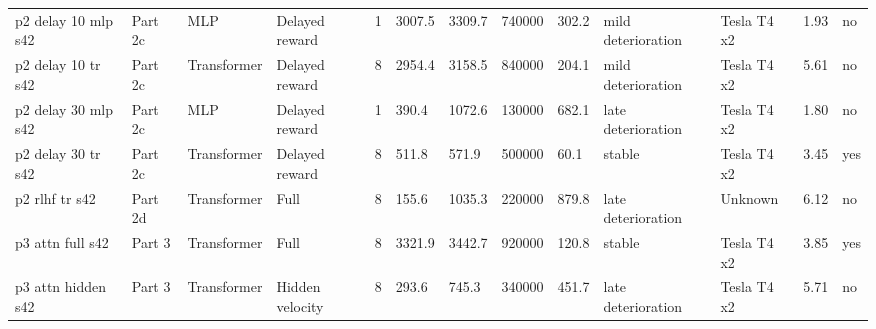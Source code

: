 \documentclass[11pt]{article}
\begin{document}
\begin{table}[!htbp]
{\begin{tabular}{lllllllllllll}
p2 delay 10 mlp s42 & Part 2c & MLP & Delayed reward & 1 & 3007.5 & 3309.7 & 740000 & 302.2 & mild deterioration & Tesla T4 x2 & 1.93 & no \\
p2 delay 10 tr s42 & Part 2c & Transformer & Delayed reward & 8 & 2954.4 & 3158.5 & 840000 & 204.1 & mild deterioration & Tesla T4 x2 & 5.61 & no \\
p2 delay 30 mlp s42 & Part 2c & MLP & Delayed reward & 1 & 390.4 & 1072.6 & 130000 & 682.1 & late deterioration & Tesla T4 x2 & 1.80 & no \\
p2 delay 30 tr s42 & Part 2c & Transformer & Delayed reward & 8 & 511.8 & 571.9 & 500000 & 60.1 & stable & Tesla T4 x2 & 3.45 & yes \\
p2 rlhf tr s42 & Part 2d & Transformer & Full & 8 & 155.6 & 1035.3 & 220000 & 879.8 & late deterioration & Unknown & 6.12 & no \\
p3 attn full s42 & Part 3 & Transformer & Full & 8 & 3321.9 & 3442.7 & 920000 & 120.8 & stable & Tesla T4 x2 & 3.85 & yes \\
p3 attn hidden s42 & Part 3 & Transformer & Hidden velocity & 8 & 293.6 & 745.3 & 340000 & 451.7 & late deterioration & Tesla T4 x2 & 5.71 & no \\
\bottomrule
\end{tabular}
}
\end{table}
\end{document}
